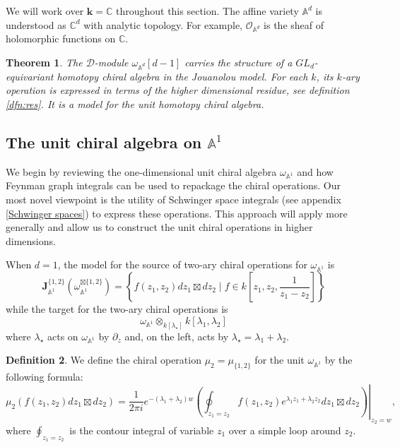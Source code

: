 \documentclass[11pt]{amsart}
\newtheorem{thm}{Theorem}[section]
\theoremstyle{definition}
\newtheorem{defn}[thm]{Definition}
\theoremstyle{remark}
\numberwithin{equation}{section}
\renewcommand{\AA}{\mathbb{A}}
\newcommand{\del}{\partial}
\begin{document}
We will work over $\mathbf{k}=\mathbb{C}$ throughout this section. The affine variety $\mathbb{A}^d$ is understood as $\mathbb{C}^d$ with analytic topology. For example, $\mathcal{O}_{\mathbb{A}^d}$ is the sheaf of holomorphic functions on $\mathbb{C}$.

\begin{thm}
  The $\mathcal{D}$-module $\omega_{\mathbb{A}^d}[d-1]$ carries the structure of a $GL_d$-equivariant homotopy chiral
  algebra in the Jouanolou model.
  For each $k$, its $k$-ary operation is expressed in terms of the higher dimensional residue, see
  definition \ref{dfn:res}.
  It is a model for the \textit{unit} homotopy chiral algebra.
\end{thm}

\subsection{The unit chiral algebra on $\mathbb{A}^1$} \label{s:feynman1d}
We begin by reviewing the one-dimensional unit chiral algebra $\omega_{\mathbb{A}^1}$ and how Feynman graph integrals
can be used to repackage the chiral operations.
Our most novel viewpoint is the utility of Schwinger space integrals (see appendix \ref{Schwinger spaces}) to express
these operations.
This approach will apply more generally and allow us to construct the unit chiral operations in higher dimensions.

When $d=1$, the model for the source of two-ary chiral operations for $\omega_{\AA^1}$ is
$$
\mathbf{J}_{\mathbb{A}^1}^{\{1,2\}}(\omega_{\mathbb{A}^1}^{\boxtimes\{1,2\}})=\left\{f(z_{1},z_{2})dz_{1}\boxtimes dz_{2} \; | \; f\in k\left[z_{1},z_{2},\frac{1}{z_{1}-z_{2}}\right]\right\}
$$
while the target for the two-ary chiral operations is
\begin{equation}\label{}
  \omega_{\mathbb{A}^1} \otimes_{k[\lambda_\star]} k[\lambda_1,\lambda_2]
\end{equation}
where $\lambda_\star$ acts on $\omega_{\AA^1}$ by $\del_z$ and, on the left, acts by $\lambda_\star = \lambda_1 +
\lambda_2$.
\begin{defn}
  We define the chiral operation $\mu_2 = \mu_{\{1,2\}}$ for the unit $\omega_{\mathbb{A}^1}$ by the following formula:
    $$
    \mu_2(f(z_{1},z_{2})dz_{1}\boxtimes dz_{2})=\frac{1}{2\pi i}e^{-(\lambda_{1}+\lambda_{2})w}\left. \left(\oint_{z_{1}=z_2}f(z_{1},z_{2})e^{\lambda_{1}z_{1}+\lambda_{2}z_{2}}dz_{1}\boxtimes dz_{2}\right)\right|_{z_{2}=w},
    $$
    where $\oint_{z_{1}=z_{2}}$ is the contour integral of variable $z_{1}$ over a simple loop around $z_{2}$.
  \end{defn}
\end{document}
